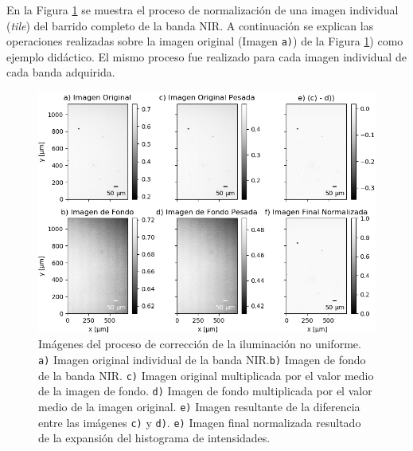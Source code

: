 En la Figura \ref{fig:correcilumims} se muestra el proceso de normalización de una imagen individual (\textit{tile}) del barrido completo de la banda NIR. A continuación se explican las operaciones realizadas sobre la imagen original (Imagen \texttt{a)}) de la Figura \ref{fig:correcilumims}) como ejemplo didáctico. El mismo proceso fue realizado para cada imagen individual de cada banda adquirida.	
\begin{figure}[H]
	\centering
\includegraphics[scale=1.1	]{Figs/defectosZEISS/correccionilum/NIR/1.png}
\caption{Imágenes del proceso de corrección de la iluminación no uniforme. \texttt{a)} Imagen original individual de la banda NIR.\texttt{b)} Imagen de fondo de la banda NIR. \texttt{c)} Imagen original multiplicada por el valor medio de la imagen de fondo. \texttt{d)} Imagen de fondo multiplicada por el valor medio de la imagen original. \texttt{e)} Imagen resultante de la diferencia entre las imágenes \texttt{c)} y \texttt{d)}. \texttt{e)} Imagen final normalizada resultado de la expansión del histograma de intensidades.}
\label{fig:correcilumims}
\end{figure}	

